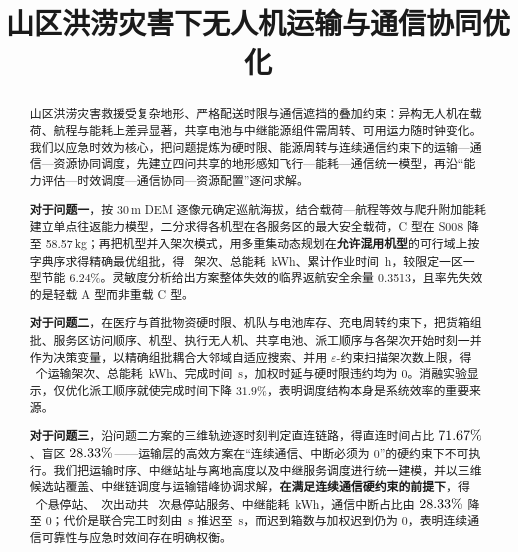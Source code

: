 \documentclass[bwprint]{gmcmthesis}
\title{山区洪涝灾害下无人机运输与通信协同优化}
\begin{document}
\maketitle

\begin{abstract}
	山区洪涝灾害救援受复杂地形、严格配送时限与通信遮挡的叠加约束：异构无人机在载荷、航程与能耗上差异显著，共享电池与中继能源组件需周转、可用运力随时钟变化。我们以应急时效为核心，把问题提炼为硬时限、能源周转与连续通信约束下的运输—通信—资源协同调度，先建立四问共享的地形感知飞行—能耗—通信统一模型，再沿“能力评估—时效调度—通信协同—资源配置”逐问求解。

	\textbf{对于问题一}，按 30\,m DEM 逐像元确定巡航海拔，结合载荷—航程等效与爬升附加能耗建立单点往返能力模型，二分求得各机型在各服务区的最大安全载荷，C 型在 S008 降至 58.57\,kg；再把机型并入架次模式，用多重集动态规划在\textbf{允许混用机型}的可行域上按字典序求得精确最优组批，得 \mtQoneTrips\ 架次、总能耗 \mtQoneEnergy\,kWh、累计作业时间 \mtQoneWorkTimeH\,h，较限定一区一型节能 $6.24\%$。灵敏度分析给出方案整体失效的临界返航安全余量 0.3513，且率先失效的是轻载 A 型而非重载 C 型。

	\textbf{对于问题二}，在医疗与首批物资硬时限、机队与电池库存、充电周转约束下，把货箱组批、服务区访问顺序、机型、执行无人机、共享电池、派工顺序与各架次开始时刻一并作为决策变量，以精确组批耦合大邻域自适应搜索、并用 $\varepsilon$-约束扫描架次数上限，得 \mtQtwoRecTrips\ 个运输架次、总能耗 \mtQtwoEnergy\,kWh、完成时间 \mtQtwoMakespan\,s，加权时延与硬时限违约均为 $0$。消融实验显示，仅优化派工顺序就使完成时间下降 $31.9\%$，表明调度结构本身是系统效率的重要来源。

	\textbf{对于问题三}，沿问题二方案的三维轨迹逐时刻判定直连链路，得直连时间占比 $71.67\%$、盲区 $28.33\%$——运输层的高效方案在“连续通信、中断必须为 $0$”的硬约束下不可执行。我们把运输时序、中继站址与离地高度以及中继服务调度进行统一建模，并以三维候选站覆盖、中继链调度与运输错峰协调求解，\textbf{在满足连续通信硬约束的前提下}，得 \mtQthreeStations\ 个悬停站、\mtQthreeRelays\ 次出动共 \mtQthreeRelayVisits\ 次悬停站服务、中继能耗 \mtQthreeRelayEnergy\,kWh，通信中断占比由 $28.33\%$ 降至 $0$；代价是联合完工时刻由 \mtQtwoMakespan\,s 推迟至 \mtQthreeJointDone\,s，而迟到箱数与加权迟到仍为 $0$，表明连续通信可靠性与应急时效间存在明确权衡。


\end{abstract}
\end{document}
